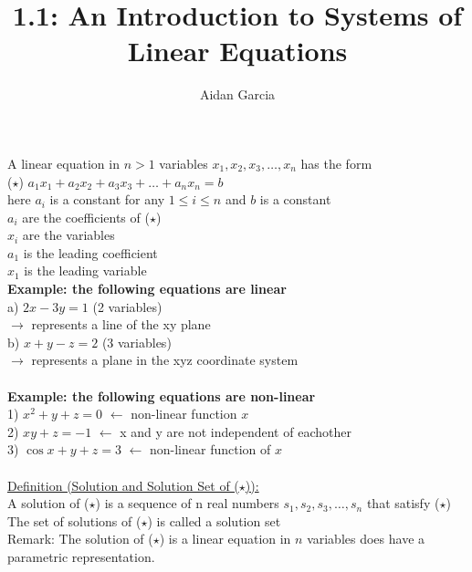 \documentclass{jhwhw}
\author{Aidan Garcia}
\title{1.1: An Introduction to Systems of Linear Equations}
\begin{document}
 \maketitle   

A linear equation in \(n>1\) variables \(x_1,x_2,x_3,\ldots,x_n\) has the form
\\
(\(\star\)) \(a_1 x_1 + a_2 x_2 + a_3 x_3 +\ldots+a_n x_n=b\)
\\

here \(a_i\) is a constant for any \(1 \leq i \leq n\) and \(b\) is a constant
\\

\(a_i\) are the coefficients of (\(\star\)) \\
\(x_i\) are the variables \\
\(a_1\) is the leading coefficient \\
\(x_1\) is the leading variable
\\

\textbf{Example: the following equations are linear}
\\
a) \(2x-3y=1\) (2 variables) \\
\(\rightarrow\) represents a line of the xy plane 
\\
b) \(x+y-z=2\) (3 variables) \\
\(\rightarrow\) represents a plane in the xyz coordinate system
\\ \\

\textbf{Example: the following equations are non-linear}
\\
1) \( \boxed{x^2} + y + z =0\) \(\leftarrow\) non-linear function \(x\)
\\
2) \(\boxed{xy} + z = -1\) \(\leftarrow\) x and y are not independent of eachother
\\
3) \(\boxed{\cos x} + y + z = 3\) \(\leftarrow\) non-linear function of \(x\)
\\ \\

\underline{Definition (Solution and Solution Set of (\(\star\))):}
\\

A solution of (\(\star\)) is a sequence of n real numbers  \(s_1, s_2, s_3,\ldots,s_n\) that satisfy  (\(\star\))
\\

The set of solutions of (\(\star\)) is called a solution set
\\

Remark: The solution of (\(\star\)) is a linear equation in \(n\) variables does have a parametric representation.
\\ \\
\end{document}
